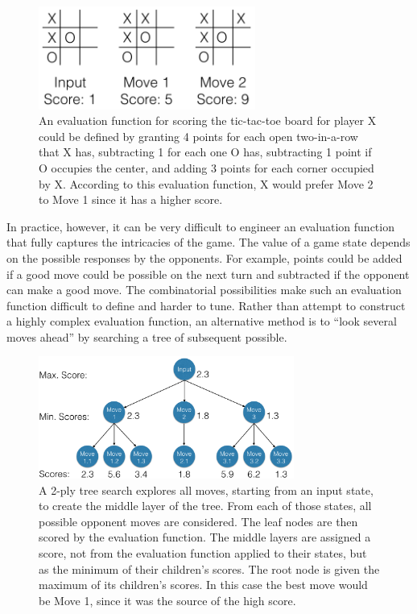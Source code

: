\documentclass{sig-alternate-05-2015}
\begin{document}
\begin{figure}[h!tbp]
\begin{center}
\includegraphics[width=2.8in]{ttt.png}
\caption{An evaluation function for scoring the tic-tac-toe board for player X could be defined by granting 4 points for each open two-in-a-row that X has, subtracting 1 for each one O has, subtracting 1 point if O occupies the center, and adding 3 points for each corner occupied by X.
According to this evaluation function, X would prefer Move 2 to Move 1 since it has a higher score.\label{fig:tictactoe}}
\end{center}
\end{figure}

In practice, however, it can be very difficult to engineer an evaluation function that fully captures the intricacies of the game. The value of a game state depends on the possible responses by the opponents. 
For example, points could be added if a good move could be possible on the next turn and subtracted if the opponent can make a good move. 
The combinatorial possibilities make such an evaluation function difficult to define and harder to tune.
Rather than attempt to construct a highly complex evaluation function, an alternative method is to ``look several moves ahead'' by searching a tree of subsequent possible.

\begin{figure}[h!tbp]
\includegraphics[width=3.3in]{tree-pic2.png}
\caption{A 2-ply tree search explores all moves, starting from an input state, to create the middle layer of the tree. From each of those states, all possible opponent moves are considered. The leaf nodes are then scored by the evaluation function. The middle layers are assigned a score, not from the evaluation function applied to their states, but as the minimum of their children's scores. The root node is given the maximum of its children's scores. In this case the best move would be Move 1, since it was the source of the high score.\label{fig:minmaxtree}}
\end{figure}
\end{document}
